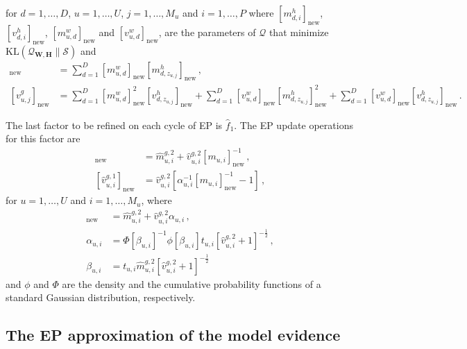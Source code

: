 \documentclass{article}
\begin{document}
for $d = 1,\ldots,D$, $u = 1,\ldots,U$, $j = 1,\ldots,M_u$ and $i = 1,\ldots,P$ where $[m_{d,i}^{h}]_\text{new}$,
$[v_{d,i}^{h}]_\text{new}$, $[ m_{u,d}^{w}]_\text{new}$ and $[v_{u,d}^{w}]_\text{new}$, are the parameters of $\mathcal{Q}$ that minimize
$\text{KL}(\mathcal{Q}_{\mathbf{W},\mathbf{H}}\|\mathcal{S})$ and
\begin{align}
[m_{u,j}^{g}]_\text{new} & = \sum_{d=1}^D [m_{u,d}^{w}]_\text{new} [m_{d,z_{u,j}}^{h}]_\text{new}\,,\\
[v_{u,j}^{g}]_\text{new} & = \sum_{d=1}^D [m_{u,d}^{w}]_\text{new}^2 [v_{d,z_{u,j}}^{h}]_\text{new} +
\sum_{d=1}^D [v_{u,d}^{w}]_\text{new} [m_{d,z_{u,j}}^{h}]_\text{new}^2 +
\sum_{d=1}^D [v_{u,d}^{w}]_\text{new} [v_{d,z_{u,j}}^{h}]_\text{new}\,.
\end{align}

The last factor to be refined on each cycle of EP is $\hat{f}_1$. The EP update operations for this factor are
\begin{align}
[\hat{m}_{u,i}^{g,1}]_\text{new} & = \hat{m}_{u,i}^{g,2} + \hat{v}_{u,i}^{g,2}
[m_{u,i}]^{-1}_\text{new}\,,\\
[\hat{v}_{u,i}^{g,1}]_\text{new} & = \hat{v}_{u,i}^{g,2} \left[ \alpha_{u,i}^{-1} [m_{u,i}]^{-1}_\text{new} - 1 \right]\,,
\end{align}
for $u = 1,\ldots,U$ and $i = 1,\ldots,M_u$, where
\begin{align}
[m_{u,i}]_\text{new} & = \hat{m}_{u,i}^{g,2} + \hat{v}_{u,i}^{g,2} \alpha_{u,i}\,,\\
\alpha_{u,i} & = \Phi[\beta_{u,i}]^{-1} \phi[\beta_{u,i}] t_{u,i} [\hat{v}_{u,i}^{g,2} + 1]^{-\frac{1}{2}}\,,\\
\beta_{u,i} & = t_{u,i} \hat{m}_{u,i}^{g,2} [\hat{v}_{u,i}^{g,2} + 1]^{-\frac{1}{2}}
\end{align}
and $\phi$ and $\Phi$ are the density and the cumulative probability functions of a standard Gaussian distribution,
respectively.

\subsection{The EP approximation of the model evidence}
\end{document}
